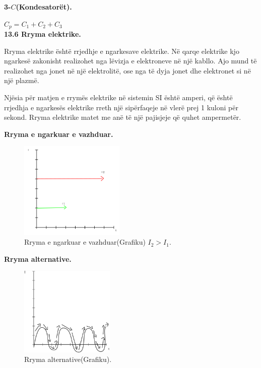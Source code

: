\documentclass[twocolumn]{article}
\begin{document}
	\textbf{3-$C$(Kondesatorët).}
	
	
	$C_p=C_1+C_2+C_3$\\
	
	\textbf{13.6 Rryma elektrike.}
	
	Rryma elektrike është rrjedhje e ngarkesave elektrike. Në qarqe elektrike kjo ngarkesë zakonisht realizohet nga lëvizja e elektroneve në një kabllo. Ajo mund të realizohet nga jonet në një elektrolitë, ose nga të dyja jonet dhe elektronet si në një plazmë.
	
	Njësia për matjen e rrymës elektrike në sistemin SI është amperi, që është rrjedhja e ngarkesës elektrike rreth një sipërfaqeje në vlerë prej 1 kuloni për sekond. Rryma elektrike matet me anë të një pajisjeje që quhet ampermetër.
	
	
	\begin{flushleft}
		\textbf{	Rryma e ngarkuar e vazhduar.}
	\end{flushleft}
	\begin{figure}[h]
		\includegraphics[width=50mm]{Imazhet/rryma e ngarkuar e vazhduar.png}
		\caption{Rryma e ngarkuar e vazhduar(Grafiku) $I_2>I_1$.}
		\label{fig:boat1}
	\end{figure}
	
	
	\begin{flushleft}
		\textbf{	Rryma alternative.}
	\end{flushleft}
	\begin{figure}[h]
		\includegraphics[width=45mm]{Imazhet/Rryma alternative.png}
		\caption{Rryma alternative(Grafiku).}
		\label{fig:boat1}
	\end{figure}
	
\end{document}
